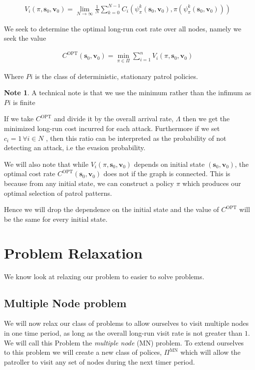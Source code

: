 \documentclass[a4paper,10pt]{article}
\theoremstyle{definition}
\theoremstyle{definition}
\theoremstyle{remark}
\theoremstyle{definition}
\newtheorem*{note}{Note}
\begin{document}
\begin{align*}
V_{i}(\pi,\bm{s}_{0},\bm{v}_{0})=\lim\limits_{N \rightarrow \infty} \frac{1}{N} \sum\limits_{k=0}^{N-1} C_{i}(\psi_{\pi}^{k}(\bm{s}_{0},\bm{v}_{0}),\pi(\psi_{\pi}^{k}(\bm{s}_{0},\bm{v}_{0})))
\end{align*}

We seek to determine the optimal long-run cost rate over all nodes, namely we seek the value

\begin{align}
C^{\text{OPT}}(\bm{s}_{0},\bm{v}_{0})= \min_{\pi \in \Pi} \sum\limits_{i=1}^{n} V_{i}(\pi,\bm{s}_{0},\bm{v}_{0})
\end{align}

Where $Pi$ is the class of deterministic, stationary patrol policies.

\begin{note}
A technical note is that we use the minimum rather than the infimum as $Pi$ is finite
\end{note}

If we take $C^{\text{OPT}}$ and divide it by the overall arrival rate, $\Lambda$ then we get the minimized long-run cost incurred for each attack. Furthermore if we set $c_{i}=1 \, \forall i \in N$ , then this ratio can be interpreted as the probability of not detecting an attack, i.e the evasion probability.

We will also note that while $V_{i}(\pi,\bm{s}_{0},\bm{v}_{0})$ depends on initial state $(\bm{s}_{0},\bm{v}_{0})$, the optimal cost rate $C^{\text{OPT}}(\bm{s}_{0},\bm{v}_{0})$ does not if the graph is connected. This is because from any initial state, we can construct a policy $\pi$ which produces our optimal selection of patrol patterns.

Hence we will drop the dependence on the initial state and the value of $C^{\text{OPT}}$ will be the same for every initial state. 

\section{Problem Relaxation}
We know look at relaxing our problem to easier to solve problems.

\subsection{Multiple Node problem}
We will now relax our class of problems to allow ourselves to visit multiple nodes in one time period, as long as the overall long-run visit rate is not greater than $1$. We will call this Problem the \textit{multiple node} (MN) problem. To extend ourselves to this problem we will create a new class of polices, $\Pi^{\text{MN}}$ which will allow the patroller to visit any set of nodes during the next timer period.
\end{document}
